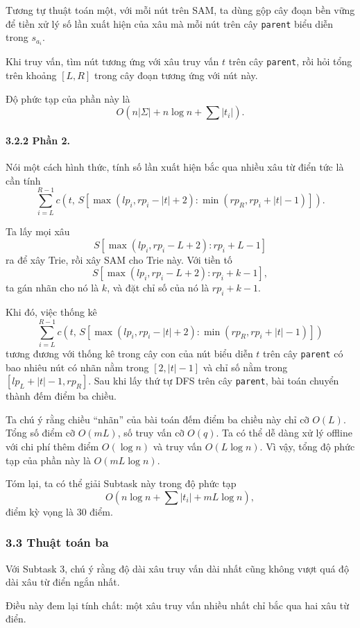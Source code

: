 \documentclass[11pt]{article}
\begin{document}
Tương tự thuật toán một, với mỗi nút trên SAM, ta dùng gộp cây đoạn bền vững để
tiền xử lý số lần xuất hiện của xâu mà mỗi nút trên cây \texttt{parent} biểu
diễn trong \(s_{a_i}\).

Khi truy vấn, tìm nút tương ứng với xâu truy vấn \(t\) trên cây \texttt{parent},
rồi hỏi tổng trên khoảng \([L,R]\) trong cây đoạn tương ứng với nút này.

Độ phức tạp của phần này là
\[
  O\left(n|\Sigma|+n\log n+\sum |t_i|\right).
\]

\paragraph{3.2.2 Phần 2.}
Nói một cách hình thức, tính số lần xuất hiện bắc qua nhiều xâu từ điển tức là
cần tính
\[
  \sum_{i=L}^{R-1}
  c\left(t,\,
    S[\max(lp_i,rp_i-|t|+2):\min(rp_R,rp_i+|t|-1)]
  \right).
\]

Ta lấy mọi xâu
\[
  S[\max(lp_i,rp_i-L+2):rp_i+L-1]
\]
ra để xây Trie, rồi xây SAM cho Trie này. Với tiền tố
\[
  S[\max(lp_i,rp_i-L+2):rp_i+k-1],
\]
ta gán nhãn cho nó là \(k\), và đặt chỉ số của nó là \(rp_i+k-1\).

Khi đó, việc thống kê
\[
  \sum_{i=L}^{R-1}
  c\left(t,\,
    S[\max(lp_i,rp_i-|t|+2):\min(rp_R,rp_i+|t|-1)]
  \right)
\]
tương đương với thống kê trong cây con của nút biểu diễn \(t\) trên cây
\texttt{parent} có bao nhiêu nút có nhãn nằm trong \([2,|t|-1]\) và chỉ số nằm
trong \([lp_L+|t|-1,rp_R]\). Sau khi lấy thứ tự DFS trên cây \texttt{parent},
bài toán chuyển thành đếm điểm ba chiều.

Ta chú ý rằng chiều ``nhãn'' của bài toán đếm điểm ba chiều này chỉ cỡ \(O(L)\).
Tổng số điểm cỡ \(O(mL)\), số truy vấn cỡ \(O(q)\). Ta có thể dễ dàng xử lý
offline với chi phí thêm điểm \(O(\log n)\) và truy vấn \(O(L\log n)\). Vì vậy,
tổng độ phức tạp của phần này là \(O(mL\log n)\).

Tóm lại, ta có thể giải Subtask này trong độ phức tạp
\[
  O\left(n\log n+\sum |t_i|+mL\log n\right),
\]
điểm kỳ vọng là \(30\) điểm.

\subsubsection*{3.3 Thuật toán ba}

Với Subtask 3, chú ý rằng độ dài xâu truy vấn dài nhất cũng không vượt quá độ
dài xâu từ điển ngắn nhất.

Điều này đem lại tính chất: một xâu truy vấn nhiều nhất chỉ bắc qua hai xâu từ
điển.
\end{document}
